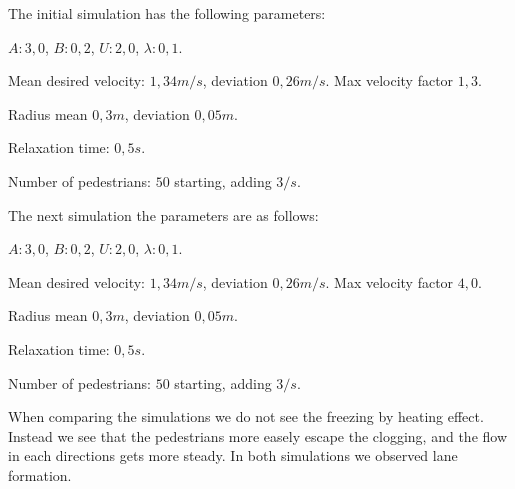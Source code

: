 The initial simulation has the following parameters:

\begin{itemize*}
    \item $A: 3,0$, $B: 0,2$, $U: 2,0$, $\lambda: 0,1$.
    \item Mean desired velocity: $1,34 m/s$, deviation $0,26 m/s$. Max 
        velocity factor $1,3$.
    \item Radius mean $0,3 m$, deviation $0,05 m$.
    \item Relaxation time: $0,5 s$.
    \item Number of pedestrians: $50$ starting, adding $3/s$.
\end{itemize*}

The next simulation the parameters are as follows:

\begin{itemize*}
    \item $A: 3,0$, $B: 0,2$, $U: 2,0$, $\lambda: 0,1$.
    \item Mean desired velocity: $1,34 m/s$, deviation $0,26 m/s$. Max 
        velocity factor $4,0$.
    \item Radius mean $0,3 m$, deviation $0,05 m$.
    \item Relaxation time: $0,5 s$.
    \item Number of pedestrians: $50$ starting, adding $3/s$.
\end{itemize*}

When comparing the simulations we do not see the freezing by heating effect.
Instead we see that the pedestrians more easely escape the clogging, and the flow in each directions
gets more steady. In both simulations we observed lane formation.

